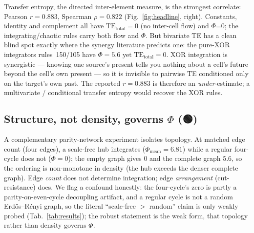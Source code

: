 \documentclass[11pt,a4paper]{article}
\providecommand{\tierGreen}{🟢}
\newcommand{\bigphi}{\ensuremath{\Phi}}
\begin{document}
Transfer entropy, the directed inter-element measure, is the strongest
correlate: Pearson \(r=0.883\), Spearman \(\rho=0.822\)
(Fig.~\ref{fig:headline}, right). Constants, identity and complement all
have \(\mathrm{TE}_\mathrm{total}=0\) (no inter-cell flow) and
\bigphi{}=0; the integrating/chaotic rules carry both flow and \bigphi{}.
But bivariate TE has a clean blind spot exactly where the synergy
literature predicts one: the pure-XOR integrators rules~150/105 have
\(\bigphi=5.6\) yet \(\mathrm{TE}_\mathrm{total}=0\). XOR integration is
synergistic --- knowing one source's present tells you nothing about a
cell's future beyond the cell's own present --- so it is invisible to
pairwise TE conditioned only on the target's own past. The reported
\(r=0.883\) is therefore an \emph{under}-estimate; a multivariate /
conditional transfer entropy would recover the XOR rules.

\subsection{Structure, not density, governs \bigphi{} (\tierGreen)}
\label{sec:structure}

A complementary parity-network experiment isolates topology. At matched
edge count (four edges), a scale-free hub integrates
(\(\bigphi_\mathrm{mean}=6.81\)) while a regular four-cycle does not
(\(\bigphi=0\)); the empty graph gives \(0\) and the complete graph
\(5.6\), so the ordering is non-monotone in density (the hub exceeds the
denser complete graph). Edge \emph{count} does not determine integration;
edge \emph{arrangement} (cut-resistance) does. We flag a confound
honestly: the four-cycle's zero is partly a parity-on-even-cycle
decoupling artifact, and a regular cycle is not a random Erd\H{o}s--R\'enyi
graph, so the literal ``scale-free \(>\) random'' claim is only weakly
probed (Tab.~\ref{tab:results}); the robust statement is the weak form,
that topology rather than density governs \bigphi{}.
\end{document}
